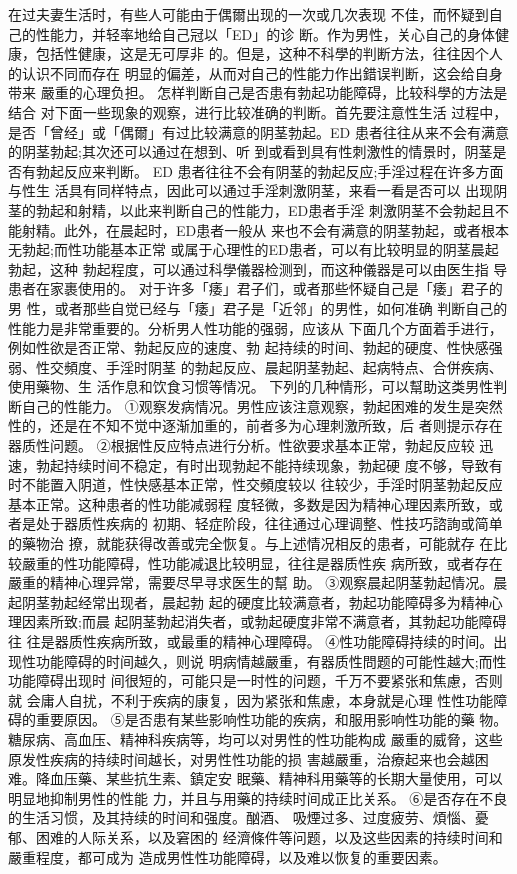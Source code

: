 \documentclass[12pt,UTF8]{ctexbook}
\begin{document}
在过夫妻生活时，有些人可能由于偶爾出现的一次或几次表现
不佳，而怀疑到自己的性能力，并轻率地给自己冠以「ED」的诊
断。作为男性，关心自己的身体健康，包括性健康，这是无可厚非
的。但是，这种不科學的判断方法，往往因个人的认识不同而存在
明显的偏差，从而对自己的性能力作出錯误判断，这会给自身带来
嚴重的心理负担。
怎样判断自己是否患有勃起功能障碍，比较科學的方法是结合
对下面一些现象的观察，进行比较准确的判断。首先要注意性生活
过程中，是否「曾经」或「偶爾」有过比较满意的阴茎勃起。ED
患者往往从来不会有满意的阴茎勃起;其次还可以通过在想到、听
到或看到具有性刺激性的情景时，阴茎是否有勃起反应来判断。
ED 患者往往不会有阴茎的勃起反应;手淫过程在许多方面与性生
活具有同样特点，因此可以通过手淫刺激阴茎，来看一看是否可以
出现阴茎的勃起和射精，以此来判断自己的性能力，ED患者手淫
刺激阴茎不会勃起且不能射精。此外，在晨起时，ED患者一般从
来也不会有满意的阴茎勃起，或者根本无勃起;而性功能基本正常
或属于心理性的ED患者，可以有比较明显的阴茎晨起勃起，这种
勃起程度，可以通过科學儀器检测到，而这种儀器是可以由医生指
导患者在家裹使用的。
对于许多「痿」君子们，或者那些怀疑自己是「痿」君子的男
性，或者那些自觉已经与「痿」君子是「近邻」的男性，如何准确
判断自己的性能力是非常重要的。分析男人性功能的强弱，应该从
下面几个方面着手进行，例如性欲是否正常、勃起反应的速度、勃
起持续的时间、勃起的硬度、性快感强弱、性交頻度、手淫时阴茎
的勃起反应、晨起阴茎勃起、起病特点、合併疾病、使用藥物、生
活作息和饮食习惯等情况。
下列的几种情形，可以幫助这类男性判断自己的性能力。
①观察发病情况。男性应该注意观察，勃起困难的发生是突然
性的，还是在不知不觉中逐渐加重的，前者多为心理刺激所致，后
者则提示存在器质性问题。
②根据性反应特点进行分析。性欲要求基本正常，勃起反应较
迅速，勃起持续时间不稳定，有时出现勃起不能持续现象，勃起硬
度不够，导致有时不能置入阴道，性快感基本正常，性交頻度较以
往较少，手淫时阴茎勃起反应基本正常。这种患者的性功能减弱程
度轻微，多数是因为精神心理因素所致，或者是处于器质性疾病的
初期、轻症阶段，往往通过心理调整、性技巧諮詢或简单的藥物治
撩，就能获得改善或完全恢复。与上述情况相反的患者，可能就存
在比较嚴重的性功能障碍，性功能减退比较明显，往往是器质性疾
病所致，或者存在嚴重的精神心理异常，需要尽早寻求医生的幫
助。
③观察晨起阴茎勃起情况。晨起阴茎勃起经常出现者，晨起勃
起的硬度比较满意者，勃起功能障碍多为精神心理因素所致;而晨
起阴茎勃起消失者，或勃起硬度非常不满意者，其勃起功能障碍往
往是器质性疾病所致，或最重的精神心理障碍。
④性功能障碍持续的时间。出现性功能障碍的时间越久，则说
明病情越嚴重，有器质性問题的可能性越大;而性功能障碍出现时
间很短的，可能只是一时性的问题，千万不要紧张和焦慮，否则就
会庸人自扰，不利于疾病的康复，因为紧张和焦慮，本身就是心理
性性功能障碍的重要原因。
⑤是否患有某些影响性功能的疾病，和服用影响性功能的藥
物。糖尿病、高血压、精神科疾病等，均可以对男性的性功能构成
嚴重的威脅，这些原发性疾病的持续时间越长，对男性性功能的损
害越嚴重，治療起来也会越困难。降血压藥、某些抗生素、鎮定安
眠藥、精神科用藥等的长期大量使用，可以明显地抑制男性的性能
力，并且与用藥的持续时间成正比关系。
⑥是否存在不良的生活习惯，及其持续的时间和强度。酗酒、
吸煙过多、过度疲劳、煩惱、憂郁、困难的人际关系，以及窘困的
经濟條件等问题，以及这些因素的持续时间和嚴重程度，都可成为
造成男性性功能障碍，以及难以恢复的重要因素。
\end{document}
